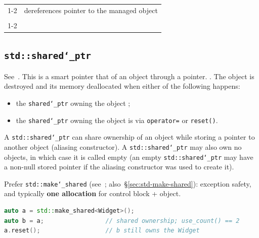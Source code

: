 \begin{table}[H]
    \begin{tabularx}{\textwidth}{|l|X|}
        \cline{1-2}
        \multirow{2}{*}{\parbox{4cm}{\href{https://en.cppreference.com/w/cpp/memory/unique_ptr/operator*}{operator*} \\
                                     \href{https://en.cppreference.com/w/cpp/memory/unique_ptr/operator*}{operator->}}} 
                        & dereferences pointer to the managed object \\
                        &  \\
        \cline{1-2}
    \end{tabularx}
\end{table}

\newpage
\subsection{\texttt{std::shared\char`_ptr}}
\label{subsec:shared-ptr}
See~\cite{cppreference-sharedptr}.
\newline
This is a smart pointer that  of an object 
through a pointer.
\newline
{}.
\newline
The object is destroyed and its memory deallocated when either of 
the following happens:
\begin{itemize}
    \item the  \texttt{shared\char`_ptr} owning 
          the object ;
    \item the  \texttt{shared\char`_ptr} owning 
          the object is  via \texttt{operator=} or 
          \texttt{reset()}.             
\end{itemize}

A \texttt{std::shared\char`_ptr} can share ownership of an object 
while storing a pointer to another object (aliasing constructor).
\newline
A \texttt{std::shared\char`_ptr} may also own no objects, 
in which case it is called empty (an empty 
\texttt{std::shared\char`_ptr} may have a non-null stored pointer 
if the aliasing constructor was used to create it). 

Prefer \texttt{std::make\char`_shared} (see~\cite{cppreference-make-shared}; 
also~\S\ref{sec:std-make-shared}): 
exception safety, and typically \textbf{one allocation} for control block + object.
\begin{lstlisting}[language=C++]
auto a = std::make_shared<Widget>();
auto b = a;                 // shared ownership; use_count() == 2
a.reset();                  // b still owns the Widget
\end{lstlisting}


